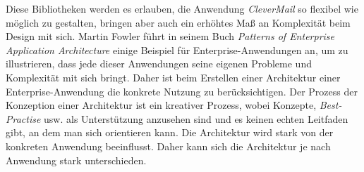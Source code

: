 Diese Bibliotheken werden es erlauben, die Anwendung \emph{CleverMail} so flexibel wie möglich zu gestalten, bringen aber auch ein erhöhtes Maß an Komplexität beim Design mit sich. 
\newline
\newline
Martin Fowler führt in seinem Buch \emph{Patterns of Enterprise Application Architecture}\cite[5-6]{patternsOfEnterprise} einige Beispiel für Enterprise-Anwendungen an, um zu illustrieren, dass jede dieser Anwendungen seine eigenen Probleme und Komplexität mit sich bringt. Daher ist beim Erstellen einer Architektur einer Enterprise-Anwendung die konkrete Nutzung zu berücksichtigen. Der Prozess der Konzeption einer Architektur ist ein kreativer Prozess, wobei Konzepte, \emph{Best-Practise} usw. als Unterstützung anzusehen sind und es keinen echten Leitfaden gibt, an dem man sich orientieren kann. Die Architektur wird stark von der konkreten Anwendung beeinflusst. Daher kann sich die Architektur je nach Anwendung stark unterschieden.

